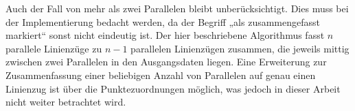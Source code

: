 \documentclass[../main/thesis.tex]{subfiles}
\begin{document}
Auch der Fall von mehr als zwei Parallelen bleibt unberücksichtigt.
Dies muss bei der Implementierung bedacht werden, da der Begriff „als zusammengefasst markiert“ sonst nicht eindeutig ist.
Der hier beschriebene Algorithmus fasst $n$ parallele Linienzüge zu $n-1$ parallelen Linienzügen zusammen, die jeweils mittig zwischen zwei Parallelen in den Ausgangsdaten liegen.
Eine Erweiterung zur Zusammenfassung einer beliebigen Anzahl von Parallelen auf genau einen Linienzug ist über die Punktezuordnungen möglich, was jedoch in dieser Arbeit nicht weiter betrachtet wird.




%				
%				
%				
%	
%	
\end{document}
